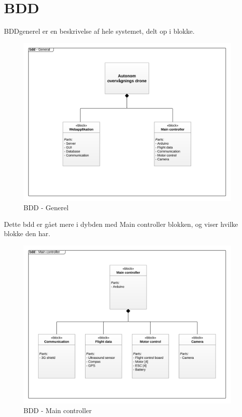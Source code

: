 \section{BDD}

BDD\textunderscore generel er en beskrivelse af hele systemet, delt op i blokke.


\begin{figure}[H]
\centering
\includegraphics[width=1\textwidth]{Billeder/BDD_overordnet}
\caption{BDD - Generel}
\label{fig:bdd_generel}
\end{figure}

Dette bdd er gået mere i dybden med Main controller blokken, og viser hvilke blokke den har.

\begin{figure}[H]
\centering
\includegraphics[width=1\textwidth]{Billeder/BDD_Maincontroller}
\caption{BDD - Main controller}
\label{fig:bdd_maincontroller}
\end{figure}

